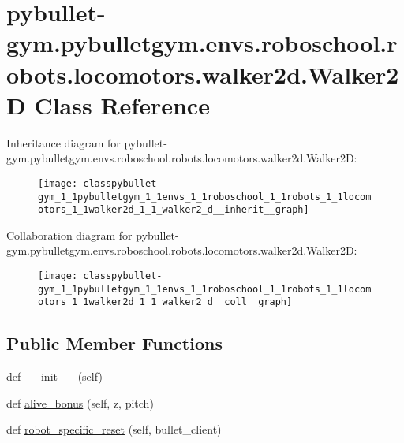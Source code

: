 \hypertarget{classpybullet-gym_1_1pybulletgym_1_1envs_1_1roboschool_1_1robots_1_1locomotors_1_1walker2d_1_1_walker2_d}{}\section{pybullet-\/gym.pybulletgym.\+envs.\+roboschool.\+robots.\+locomotors.\+walker2d.\+Walker2D Class Reference}
\label{classpybullet-gym_1_1pybulletgym_1_1envs_1_1roboschool_1_1robots_1_1locomotors_1_1walker2d_1_1_walker2_d}


Inheritance diagram for pybullet-\/gym.pybulletgym.\+envs.\+roboschool.\+robots.\+locomotors.\+walker2d.\+Walker2D\+:
\nopagebreak
\begin{figure}[H]
\begin{center}
\leavevmode
\texttt{[image: classpybullet-gym\_1\_1pybulletgym\_1\_1envs\_1\_1roboschool\_1\_1robots\_1\_1locomotors\_1\_1walker2d\_1\_1\_walker2\_d\_\_inherit\_\_graph]}
\end{center}
\end{figure}


Collaboration diagram for pybullet-\/gym.pybulletgym.\+envs.\+roboschool.\+robots.\+locomotors.\+walker2d.\+Walker2D\+:
\nopagebreak
\begin{figure}[H]
\begin{center}
\leavevmode
\texttt{[image: classpybullet-gym\_1\_1pybulletgym\_1\_1envs\_1\_1roboschool\_1\_1robots\_1\_1locomotors\_1\_1walker2d\_1\_1\_walker2\_d\_\_coll\_\_graph]}
\end{center}
\end{figure}
\subsection*{Public Member Functions}
\begin{DoxyCompactItemize}
\item 
def \hyperlink{classpybullet-gym_1_1pybulletgym_1_1envs_1_1roboschool_1_1robots_1_1locomotors_1_1walker2d_1_1_walker2_d_a835e45e39428909d1d85d82e70f31f49}{\+\_\+\+\_\+init\+\_\+\+\_\+} (self)
\item 
def \hyperlink{classpybullet-gym_1_1pybulletgym_1_1envs_1_1roboschool_1_1robots_1_1locomotors_1_1walker2d_1_1_walker2_d_aad8238b6cbc1abc09fef176d44bd6a75}{alive\+\_\+bonus} (self, z, pitch)
\item 
def \hyperlink{classpybullet-gym_1_1pybulletgym_1_1envs_1_1roboschool_1_1robots_1_1locomotors_1_1walker2d_1_1_walker2_d_a2b688979f1de6932e97242f7f5feaa50}{robot\+\_\+specific\+\_\+reset} (self, bullet\+\_\+client)
\end{DoxyCompactItemize}
